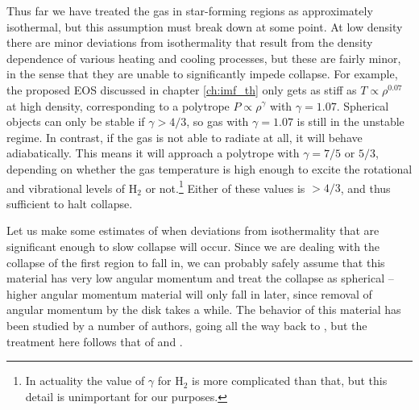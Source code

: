 Thus far we have treated the gas in star-forming regions as approximately isothermal, but this assumption must break down at some point. At low density there are minor deviations from isothermality that result from the density dependence of various heating and cooling processes, but these are fairly minor, in the sense that they are unable to significantly impede collapse. For example, the proposed \citet{larson05a} EOS discussed in chapter \ref{ch:imf_th} only gets as stiff as $T\propto \rho^{0.07}$ at high density, corresponding to a polytrope $P\propto \rho^{\gamma}$ with $\gamma=1.07$. Spherical objects can only be stable if $\gamma>4/3$, so gas with $\gamma=1.07$ is still in the unstable regime. In contrast, if the gas is not able to radiate at all, it will behave adiabatically. This means it will approach a polytrope with $\gamma=7/5$ or $5/3$, depending on whether the gas temperature is high enough to excite the rotational and vibrational levels of H$_2$ or not.\footnote{In actuality the value of $\gamma$ for H$_2$ is more complicated than that, but this detail is unimportant for our purposes.} Either of these values is $>4/3$, and thus sufficient to halt collapse.

Let us make some estimates of when deviations from isothermality that are significant enough to slow collapse will occur. Since we are dealing with the collapse of the first region to fall in, we can probably safely assume that this material has very low angular momentum and treat the collapse as spherical -- higher angular momentum material will only fall in later, since removal of angular momentum by the disk takes a while. The behavior of this material has been studied by a number of authors, going all the way back to \citet{larson69a}, but the treatment here follows that of \citet{masunaga98a} and \citet{masunaga00a}.


